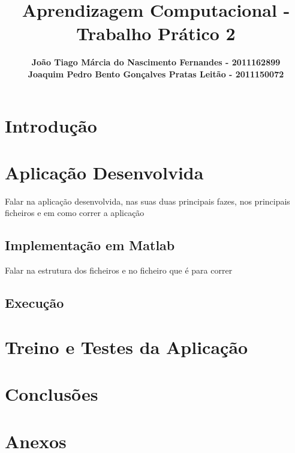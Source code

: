 \documentclass{article}
\title{\bf{Aprendizagem Computacional - Trabalho Prático 2}\vspace{80mm}}
\author{\textbf{João Tiago Márcia do Nascimento Fernandes - 2011162899} \\
\textbf{Joaquim Pedro Bento Gonçalves Pratas Leitão - 2011150072}}
\begin{document}
\maketitle

\pagebreak

\renewcommand*\contentsname{Índice}
\tableofcontents

\pagebreak

\section{Introdução}


\pagebreak

\section{Aplicação Desenvolvida}

Falar na aplicação desenvolvida, nas suas duas principais fazes, nos principais ficheiros e em como correr a aplicação



\subsection{Implementação em Matlab}

Falar na estrutura dos ficheiros e no ficheiro que é para correr

\subsection{Execução}



\pagebreak

\section{Treino e Testes da Aplicação}



\pagebreak

\section{Conclusões}


\pagebreak

\section{Anexos}
\end{document}
